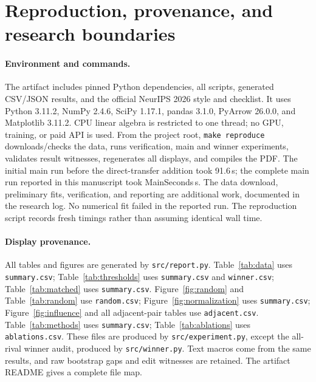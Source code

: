 \documentclass{article}
\newcommand{\num}[1]{\csname #1\endcsname}
\begin{document}
\section{Reproduction, provenance, and research boundaries}
\label{app:repro}
\paragraph{Environment and commands.}
The artifact includes pinned Python dependencies, all scripts, generated CSV/JSON results, and the official NeurIPS 2026 style and checklist. It uses Python 3.11.2, NumPy 2.4.6, SciPy 1.17.1, pandas 3.1.0, PyArrow 26.0.0, and Matplotlib 3.11.2. CPU linear algebra is restricted to one thread; no GPU, training, or paid API is used. From the project root, \texttt{make reproduce} downloads/checks the data, runs verification, main and winner experiments, validates result witnesses, regenerates all displays, and compiles the PDF. The initial main run before the direct-transfer addition took 91.6\,s; the complete main run reported in this manuscript took \num{MainSeconds}\,s. The data download, preliminary fits, verification, and reporting are additional work, documented in the research log. No numerical fit failed in the reported run. The reproduction script records fresh timings rather than assuming identical wall time.

\paragraph{Display provenance.}
All tables and figures are generated by \texttt{src/report.py}. Table~\ref{tab:data} uses \texttt{summary.csv}; Table~\ref{tab:thresholds} uses \texttt{summary.csv} and \texttt{winner.csv}; Table~\ref{tab:matched} uses \texttt{summary.csv}. Figure~\ref{fig:random} and Table~\ref{tab:random} use \texttt{random.csv}; Figure~\ref{fig:normalization} uses \texttt{summary.csv}; Figure~\ref{fig:influence} and all adjacent-pair tables use \texttt{adjacent.csv}. Table~\ref{tab:methods} uses \texttt{summary.csv}; Table~\ref{tab:ablations} uses \texttt{ablations.csv}. These files are produced by \texttt{src/experiment.py}, except the all-rival winner audit, produced by \texttt{src/winner.py}. Text macros come from the same results, and raw bootstrap gaps and edit witnesses are retained. The artifact README gives a complete file map.
\end{document}
